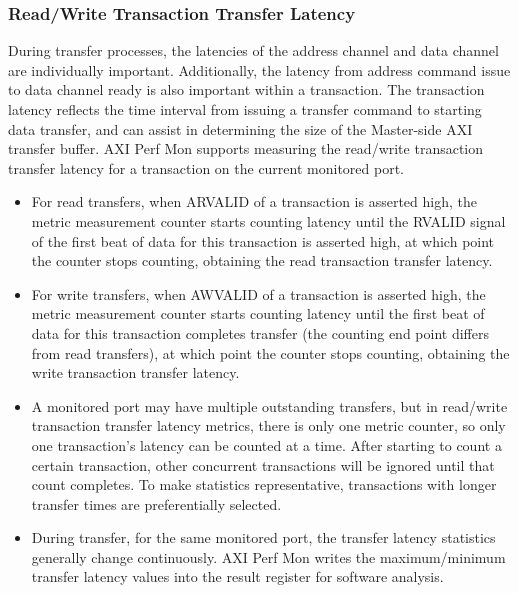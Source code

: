 \documentclass[main\_\_EN.tex]{subfiles}
\begin{document}
\subsubsection{Read/Write Transaction Transfer Latency}
During transfer processes, the latencies of the address channel and data channel are individually important. Additionally, the latency from address command issue to data channel ready is also important within a transaction. The transaction latency reflects the time interval from issuing a transfer command to starting data transfer, and can assist in determining the size of the Master-side AXI transfer buffer. AXI Perf Mon supports measuring the read/write transaction transfer latency for a transaction on the current monitored port.
\begin{itemize}
    \item For read transfers, when ARVALID of a transaction is asserted high, the metric measurement counter starts counting latency until the RVALID signal of the first beat of data for this transaction is asserted high, at which point the counter stops counting, obtaining the read transaction transfer latency.
    \item For write transfers, when AWVALID of a transaction is asserted high, the metric measurement counter starts counting latency until the first beat of data for this transaction completes transfer (the counting end point differs from read transfers), at which point the counter stops counting, obtaining the write transaction transfer latency.
    \item A monitored port may have multiple outstanding transfers, but in read/write transaction transfer latency metrics, there is only one metric counter, so only one transaction's latency can be counted at a time. After starting to count a certain transaction, other concurrent transactions will be ignored until that count completes. To make statistics representative, transactions with longer transfer times are preferentially selected.
    \item During transfer, for the same monitored port, the transfer latency statistics generally change continuously. AXI Perf Mon writes the maximum/minimum transfer latency values into the result register for software analysis.
\end{itemize}
\end{document}
